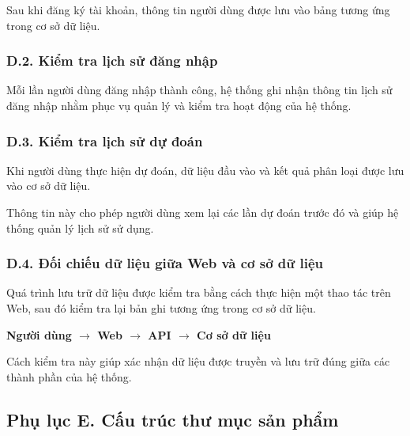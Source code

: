 \documentclass[14pt]{extarticle}
\begin{document}
	\noindent
	Sau khi đăng ký tài khoản, thông tin người dùng được lưu vào bảng
	tương ứng trong cơ sở dữ liệu.
	
	
	\subsubsection*{D.2. Kiểm tra lịch sử đăng nhập}
	
	\noindent
	Mỗi lần người dùng đăng nhập thành công, hệ thống ghi nhận thông tin
	lịch sử đăng nhập nhằm phục vụ quản lý và kiểm tra hoạt động của hệ thống.
	

	
	\subsubsection*{D.3. Kiểm tra lịch sử dự đoán}
	
	\noindent
	Khi người dùng thực hiện dự đoán, dữ liệu đầu vào và kết quả phân loại
	được lưu vào cơ sở dữ liệu.
	
	\noindent
	Thông tin này cho phép người dùng xem lại các lần dự đoán trước đó và
	giúp hệ thống quản lý lịch sử sử dụng.
	
	\subsubsection*{D.4. Đối chiếu dữ liệu giữa Web và cơ sở dữ liệu}
	
	\noindent
	Quá trình lưu trữ dữ liệu được kiểm tra bằng cách thực hiện một thao tác
	trên Web, sau đó kiểm tra lại bản ghi tương ứng trong cơ sở dữ liệu.
	
	\begin{center}
		\textbf{
			Người dùng
			$\rightarrow$
			Web
			$\rightarrow$
			API
			$\rightarrow$
			Cơ sở dữ liệu
		}
	\end{center}
	
	\noindent
	Cách kiểm tra này giúp xác nhận dữ liệu được truyền và lưu trữ đúng
	giữa các thành phần của hệ thống.
	
	
	

	\subsection*{Phụ lục E. Cấu trúc thư mục sản phẩm}
	
\end{document}
